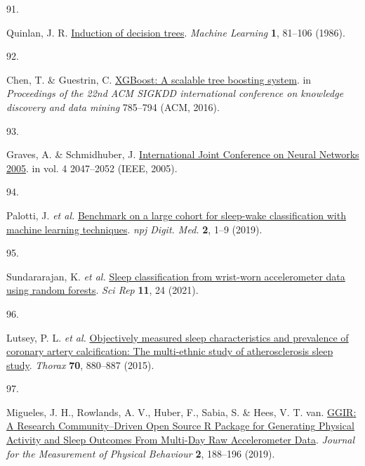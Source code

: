 \documentclass[
  10pt,
]{scrbook}
\newlength{\cslhangindent}
\newlength{\csllabelwidth}
\newlength{\cslentryspacingunit} %
\newenvironment{CSLReferences}[2] %
 {%
  \setlength{\parindent}{0pt}
  \ifodd #1
  \let\oldpar\par
  \def\par{\hangindent=\cslhangindent\oldpar}
  \fi
  \setlength{\parskip}{#2\cslentryspacingunit}
 }%
 {}
\newcommand{\CSLLeftMargin}[1]{\parbox[t]{\csllabelwidth}{#1}}
\newcommand{\CSLRightInline}[1]{\parbox[t]{\linewidth - \csllabelwidth}{#1}\break}
\let\originaltextbf\textbf
\renewcommand{\textbf}[1]{\textcolor{color1}{\textsf{\originaltextbf{#1}}}}
\begin{document}
\begin{CSLReferences}{0}{0}
\leavevmode{}%
\CSLLeftMargin{91. }%
\CSLRightInline{Quinlan, J. R.
\href{https://doi.org/10.1007/BF00116251}{Induction of decision trees}.
\emph{Machine Learning} \textbf{1}, 81--106 (1986).}

\leavevmode{}%
\CSLLeftMargin{92. }%
\CSLRightInline{Chen, T. \& Guestrin, C.
\href{https://doi.org/10.1145/2939672.2939785}{{XGBoost}: A scalable
tree boosting system}. in \emph{Proceedings of the 22nd ACM SIGKDD
international conference on knowledge discovery and data mining}
785--794 (ACM, 2016).}

\leavevmode{}%
\CSLLeftMargin{93. }%
\CSLRightInline{Graves, A. \& Schmidhuber, J.
\href{https://doi.org/10.1109/IJCNN.2005.1556215}{International Joint
Conference on Neural Networks 2005}. in vol. 4 2047--2052 (IEEE, 2005).}

\leavevmode{}%
\CSLLeftMargin{94. }%
\CSLRightInline{Palotti, J. \emph{et al.}
\href{https://doi.org/10.1038/s41746-019-0126-9}{Benchmark on a large
cohort for sleep-wake classification with machine learning techniques}.
\emph{npj Digit. Med.} \textbf{2}, 1--9 (2019).}

\leavevmode{}%
\CSLLeftMargin{95. }%
\CSLRightInline{Sundararajan, K. \emph{et al.}
\href{https://doi.org/10.1038/s41598-020-79217-x}{Sleep classification
from wrist-worn accelerometer data using random forests}. \emph{Sci Rep}
\textbf{11}, 24 (2021).}

\leavevmode{}%
\CSLLeftMargin{96. }%
\CSLRightInline{Lutsey, P. L. \emph{et al.}
\href{https://doi.org/10.1136/thoraxjnl-2015-206871}{Objectively
measured sleep characteristics and prevalence of coronary artery
calcification: The multi-ethnic study of atherosclerosis sleep study}.
\emph{Thorax} \textbf{70}, 880--887 (2015).}

\leavevmode{}%
\CSLLeftMargin{97. }%
\CSLRightInline{Migueles, J. H., Rowlands, A. V., Huber, F., Sabia, S.
\& Hees, V. T. van.
\href{https://doi.org/10.1123/jmpb.2018-0063}{{GGIR}: {A} {Research}
{Community}--{Driven} {Open} {Source} {R} {Package} for {Generating}
{Physical} {Activity} and {Sleep} {Outcomes} {From} {Multi}-{Day} {Raw}
{Accelerometer} {Data}}. \emph{Journal for the Measurement of Physical
Behaviour} \textbf{2}, 188--196 (2019).}


\end{CSLReferences}
\end{document}
